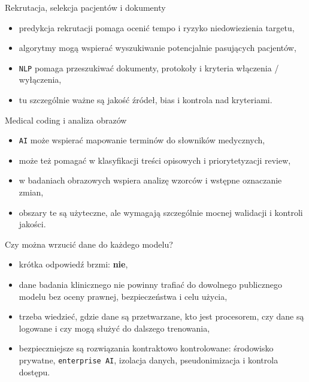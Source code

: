 \begin{frame}{Rekrutacja, selekcja pacjentów i dokumenty}
  \begin{itemize}
    \item predykcja rekrutacji pomaga ocenić tempo i ryzyko niedowiezienia targetu,
    \item algorytmy mogą wspierać wyszukiwanie potencjalnie pasujących pacjentów,
    \item \texttt{NLP} pomaga przeszukiwać dokumenty, protokoły i kryteria włączenia / wyłączenia,
    \item tu szczególnie ważne są jakość źródeł, bias i kontrola nad kryteriami.
  \end{itemize}
\end{frame}

\begin{frame}{Medical coding i analiza obrazów}
  \begin{itemize}
    \item \texttt{AI} może wspierać mapowanie terminów do słowników medycznych,
    \item może też pomagać w klasyfikacji treści opisowych i priorytetyzacji review,
    \item w badaniach obrazowych wspiera analizę wzorców i wstępne oznaczanie zmian,
    \item obszary te są użyteczne, ale wymagają szczególnie mocnej walidacji i kontroli jakości.
  \end{itemize}
\end{frame}

\begin{frame}{Czy można wrzucić dane do każdego modelu?}
  \begin{itemize}
    \item krótka odpowiedź brzmi: \textbf{nie},
    \item dane badania klinicznego nie powinny trafiać do dowolnego publicznego modelu bez oceny prawnej, bezpieczeństwa i celu użycia,
    \item trzeba wiedzieć, gdzie dane są przetwarzane, kto jest procesorem, czy dane są logowane i czy mogą służyć do dalszego trenowania,
    \item bezpieczniejsze są rozwiązania kontraktowo kontrolowane: środowisko prywatne, \texttt{enterprise AI}, izolacja danych, pseudonimizacja i kontrola dostępu.
  \end{itemize}
\end{frame}

